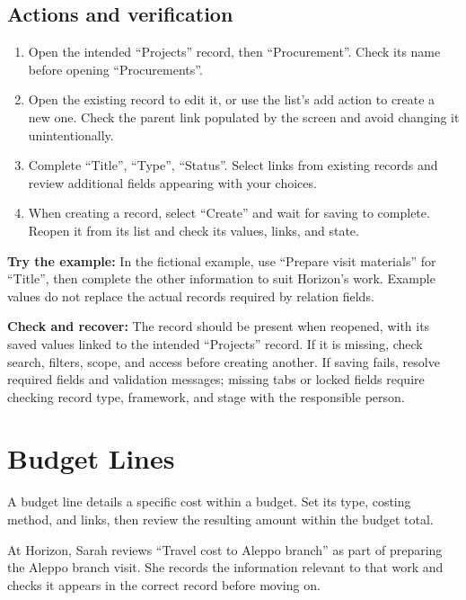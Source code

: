\subsection{Actions and verification}
\begin{enumerate}
\item Open the intended “Projects” record, then “Procurement”. Check its name before opening “Procurements”.
\item Open the existing record to edit it, or use the list's add action to create a new one. Check the parent link populated by the screen and avoid changing it unintentionally.
\item Complete “Title”, “Type”, “Status”. Select links from existing records and review additional fields appearing with your choices.
\item When creating a record, select “Create” and wait for saving to complete. Reopen it from its list and check its values, links, and state.
\end{enumerate}

\textbf{Try the example:} In the fictional example, use “Prepare visit materials” for “Title”, then complete the other information to suit Horizon's work. Example values do not replace the actual records required by relation fields.

\textbf{Check and recover:} The record should be present when reopened, with its saved values linked to the intended “Projects” record. If it is missing, check search, filters, scope, and access before creating another. If saving fails, resolve required fields and validation messages; missing tabs or locked fields require checking record type, framework, and stage with the responsible person.

\clearpage
\section{Budget Lines}
\label{sec:projects-feature-budget-lines}

A budget line details a specific cost within a budget. Set its type, costing method, and links, then review the resulting amount within the budget total.

\begin{rcnote}
At Horizon, Sarah reviews “Travel cost to Aleppo branch” as part of preparing the Aleppo branch visit. She records the information relevant to that work and checks it appears in the correct record before moving on.
\end{rcnote}


